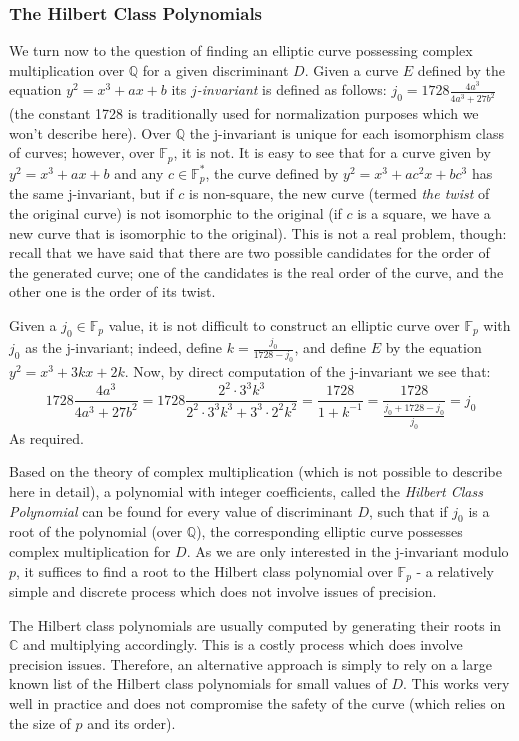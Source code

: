 \documentclass[11pt,english]{article}
\begin{document}
\subsubsection{The Hilbert Class Polynomials}
We turn now to the question of finding an elliptic curve possessing complex multiplication over $\mathbb{Q}$ for a given discriminant $D$. Given a
curve $E$ defined by the equation $y^2=x^3+ax+b$ its \emph{$j$-invariant} is defined as follows: $j_0=1728\frac{4a^3}{4a^3+27b^2}$ (the
constant 1728 is traditionally used for normalization purposes which we won't describe here). Over $\mathbb{Q}$ the j-invariant is unique for each
isomorphism class of curves; however, over $\mathbb{F}_p$, it is not. It is easy to see that for a curve given by $y^2=x^3+ax+b$ and any $c\in\mathbb{F}^*_p$,
the curve defined by $y^2=x^3+ac^2x+bc^3$ has the same j-invariant, but if $c$ is non-square, the new curve (termed \emph{the twist} of the original curve)
is not isomorphic to the original (if $c$ is a square, we have a new curve that is isomorphic to the original). This is not a real problem, though: recall that we have said that there are two possible candidates for the order of
the generated curve; one of the candidates is the real order of the curve, and the other one is the order of its twist.

Given a $j_0\in\mathbb{F}_p$ value, it is not difficult to construct an elliptic curve over $\mathbb{F}_p$ with $j_0$ as the j-invariant;
indeed, define $k=\frac{j_0}{1728-j_0}$, and define $E$ by the equation $y^2=x^3+3kx+2k$. Now, by direct computation of the j-invariant we see that:
$$1728\frac{4a^3}{4a^3+27b^2}=1728\frac{2^2\cdot 3^3k^3}{2^2\cdot 3^3k^3+3^3\cdot 2^2k^2}=\frac{1728}{1+k^{-1}}=
\frac{1728}{\frac{j_0+1728-j_0}{j_0}}=j_0$$
As required.

Based on the theory of complex multiplication (which is not possible to describe here in detail), a polynomial with integer coefficients, called the \emph{Hilbert Class Polynomial}
can be found for every value of discriminant $D$, such that if $j_0$ is a root of the polynomial (over $\mathbb{Q}$), the corresponding elliptic curve
possesses complex multiplication for $D$. As we are only interested in the j-invariant modulo $p$, it suffices to find a root to the Hilbert class polynomial
over $\mathbb{F}_p$ - a relatively simple and discrete process which does not involve issues of precision.

The Hilbert class polynomials are usually computed by generating their roots in $\mathbb{C}$ and multiplying accordingly. This is a costly process which
does involve precision issues. Therefore, an alternative approach is simply to rely on a large known list of the Hilbert class polynomials for small values of $D$. This
works very well in practice and does not compromise the safety of the curve (which relies on the size of $p$ and its order).
\end{document}
